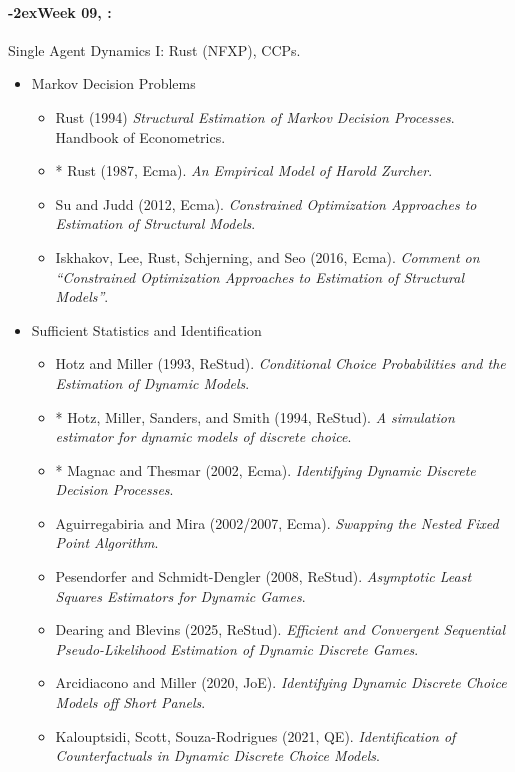 \documentclass[11pt]{article}
\newcommand{\week}[1]{%
  \sbox{\weekdatebox}{\syldate{\today}}%
  \paragraph*{\kern-2ex\quad #1, \usebox{\weekdatebox}:}%
  \AdvanceDate[7]%
}
\begin{document}
\week{Week 09} Single Agent Dynamics I: Rust (NFXP), CCPs.
\begin{itemize}
\item Markov Decision Problems
\begin{itemize}
\item Rust (1994) \textit{Structural Estimation of Markov Decision Processes}. Handbook of Econometrics.
\item * Rust (1987, Ecma). \textit{An Empirical Model of Harold Zurcher}.
\item Su and Judd (2012, Ecma). \textit{Constrained Optimization Approaches to Estimation of Structural Models}.
\item Iskhakov, Lee, Rust, Schjerning, and Seo (2016, Ecma). \textit{Comment on ``Constrained Optimization Approaches to Estimation of Structural Models''}.
\end{itemize}
\item Sufficient Statistics and Identification
\begin{itemize}
\item Hotz and Miller (1993, ReStud). \textit{Conditional Choice Probabilities and the Estimation of Dynamic Models}.
\item * Hotz, Miller, Sanders, and Smith (1994, ReStud). \textit{A simulation estimator for dynamic models of discrete choice}.
\item * Magnac and Thesmar (2002, Ecma). \textit{Identifying Dynamic Discrete Decision Processes}.
\item Aguirregabiria and Mira (2002/2007, Ecma). \textit{Swapping the Nested Fixed Point Algorithm}.
\item Pesendorfer and Schmidt-Dengler (2008, ReStud). \textit{Asymptotic Least Squares Estimators for Dynamic Games}.
\item Dearing and Blevins (2025, ReStud). \textit{Efficient and Convergent Sequential Pseudo-Likelihood Estimation of Dynamic Discrete Games}.
\item Arcidiacono and Miller (2020, JoE). \textit{Identifying Dynamic Discrete Choice Models
off Short Panels}.
\item Kalouptsidi, Scott, Souza-Rodrigues (2021, QE). \textit{Identification of Counterfactuals
in Dynamic Discrete Choice Models}.
\end{itemize}
\end{itemize}
\end{document}
